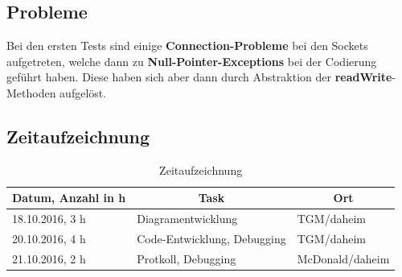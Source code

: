 \subsection{Probleme}
Bei den ersten Tests sind einige \textbf{Connection-Probleme} bei den Sockets aufgetreten, welche dann zu \textbf{Null-Pointer-Exceptions} bei der Codierung geführt haben. Diese haben sich aber dann durch Abstraktion der \textbf{readWrite}-Methoden aufgelöst.

\subsection{Zeitaufzeichnung}

\begin{table}[!h]
	\centering
	\caption{Zeitaufzeichnung}
	\label{my-label}
	\begin{tabular}{|l|l|l|}
		\hline
		\multicolumn{1}{|c|}{\textbf{Datum, Anzahl in h}} & \multicolumn{1}{c|}{\textbf{Task}} & \multicolumn{1}{c|}{\textbf{Ort}} \\ \hline
		18.10.2016, 3 h                                   & Diagramentwicklung                 & TGM/daheim                        \\ \hline
		20.10.2016, 4 h                                   & Code-Entwicklung, Debugging        & TGM/daheim                        \\ \hline
		21.10.2016, 2 h                                   & Protkoll, Debugging                & McDonald/daheim                   \\ \hline
	\end{tabular}
\end{table}



